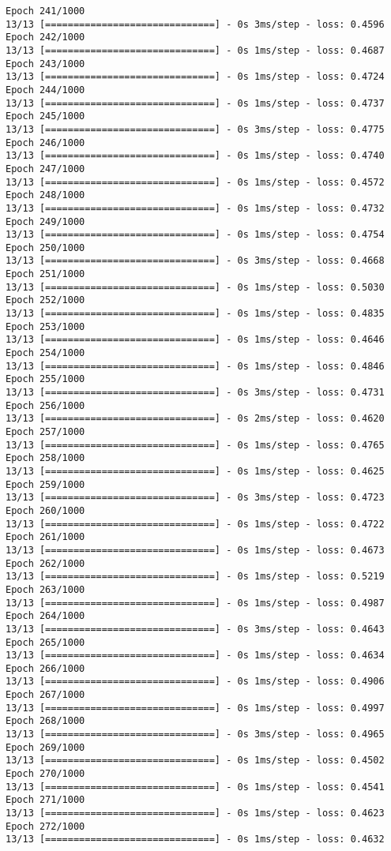 \documentclass[11pt]{article}
\begin{document}
\begin{Verbatim}[commandchars=\\\{\}]
Epoch 241/1000
13/13 [==============================] - 0s 3ms/step - loss: 0.4596
Epoch 242/1000
13/13 [==============================] - 0s 1ms/step - loss: 0.4687
Epoch 243/1000
13/13 [==============================] - 0s 1ms/step - loss: 0.4724
Epoch 244/1000
13/13 [==============================] - 0s 1ms/step - loss: 0.4737
Epoch 245/1000
13/13 [==============================] - 0s 3ms/step - loss: 0.4775
Epoch 246/1000
13/13 [==============================] - 0s 1ms/step - loss: 0.4740
Epoch 247/1000
13/13 [==============================] - 0s 1ms/step - loss: 0.4572
Epoch 248/1000
13/13 [==============================] - 0s 1ms/step - loss: 0.4732
Epoch 249/1000
13/13 [==============================] - 0s 1ms/step - loss: 0.4754
Epoch 250/1000
13/13 [==============================] - 0s 3ms/step - loss: 0.4668
Epoch 251/1000
13/13 [==============================] - 0s 1ms/step - loss: 0.5030
Epoch 252/1000
13/13 [==============================] - 0s 1ms/step - loss: 0.4835
Epoch 253/1000
13/13 [==============================] - 0s 1ms/step - loss: 0.4646
Epoch 254/1000
13/13 [==============================] - 0s 1ms/step - loss: 0.4846
Epoch 255/1000
13/13 [==============================] - 0s 3ms/step - loss: 0.4731
Epoch 256/1000
13/13 [==============================] - 0s 2ms/step - loss: 0.4620
Epoch 257/1000
13/13 [==============================] - 0s 1ms/step - loss: 0.4765
Epoch 258/1000
13/13 [==============================] - 0s 1ms/step - loss: 0.4625
Epoch 259/1000
13/13 [==============================] - 0s 3ms/step - loss: 0.4723
Epoch 260/1000
13/13 [==============================] - 0s 1ms/step - loss: 0.4722
Epoch 261/1000
13/13 [==============================] - 0s 1ms/step - loss: 0.4673
Epoch 262/1000
13/13 [==============================] - 0s 1ms/step - loss: 0.5219
Epoch 263/1000
13/13 [==============================] - 0s 1ms/step - loss: 0.4987
Epoch 264/1000
13/13 [==============================] - 0s 3ms/step - loss: 0.4643
Epoch 265/1000
13/13 [==============================] - 0s 1ms/step - loss: 0.4634
Epoch 266/1000
13/13 [==============================] - 0s 1ms/step - loss: 0.4906
Epoch 267/1000
13/13 [==============================] - 0s 1ms/step - loss: 0.4997
Epoch 268/1000
13/13 [==============================] - 0s 3ms/step - loss: 0.4965
Epoch 269/1000
13/13 [==============================] - 0s 1ms/step - loss: 0.4502
Epoch 270/1000
13/13 [==============================] - 0s 1ms/step - loss: 0.4541
Epoch 271/1000
13/13 [==============================] - 0s 1ms/step - loss: 0.4623
Epoch 272/1000
13/13 [==============================] - 0s 1ms/step - loss: 0.4632

\end{Verbatim}
\end{document}
